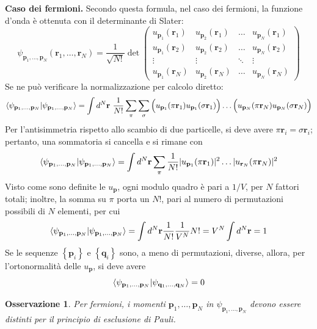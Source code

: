 \documentclass[11pt, a4paper]{scrartcl}
\theoremstyle{style}
\newtheorem{osservazione}{Osservazione}[section]
\theoremstyle{style1}
\numberwithin{equation}{subsection}
\begin{document}
\textbf{Caso dei fermioni.} Secondo questa formula, nel caso dei fermioni, la funzione d'onda \`e ottenuta con il determinante di Slater:
\[
	\psi _{\mathbf{p} _1,\ldots, \mathbf{p} _N} (\mathbf{r} _1,\ldots,\mathbf{r} _N) = \frac{1}{\sqrt{N!} } \det \begin{pmatrix} u_{\mathbf{p} _1} (\mathbf{r} _1) & u_{\mathbf{p} _2} (\mathbf{r} _1) &\ldots & u_{\mathbf{p} _N} (\mathbf{r} _1)\\u_{\mathbf{p} _1} (\mathbf{r} _2) & u_{\mathbf{p} _2} (\mathbf{r} _2) &\ldots & u_{\mathbf{p} _N} (\mathbf{r} _2)\\ \vdots & \vdots & \ddots & \vdots \\ u_{\mathbf{p} _1} (\mathbf{r} _N)&u_{\mathbf{p} _2} (\mathbf{r} _N)&\ldots& u_{\mathbf{p} _N} (\mathbf{r} _N)\end{pmatrix} 
\] 
Se ne pu\`o verificare la normalizzazione per calcolo diretto:
\[
\braket{\psi _{\mathbf{p} _1 ,\ldots, \mathbf{p} _N} |\psi _{\mathbf{p} _1,\ldots,\mathbf{p} _N} }  = \int d^N \mathbf{r}  \ \frac{1}{N!} \sum_{\pi}^{} \sum_{\sigma }^{} \Big(u_{\mathbf{p} _1} (\pi \mathbf{r} _1) u_{\mathbf{p} _1} (\sigma \mathbf{r} _1)\Big) \ldots \Big(u_{\mathbf{p} _N} (\pi\mathbf{r} _N) u_{\mathbf{p} _N} (\sigma \mathbf{r} _N )\Big)
\] 
Per l'antisimmetria rispetto allo scambio di due particelle, si deve avere $\pi \mathbf{r} _i = \sigma \mathbf{r} _i$; pertanto, una sommatoria si cancella e si rimane con
\[
\braket{\psi _{\mathbf{p} _1 ,\ldots, \mathbf{p} _N} |\psi _{\mathbf{p} _1,\ldots,\mathbf{p} _N} }  = \int d^N \mathbf{r} \sum_{\pi}^{} \frac{1}{N!} \lvert u_{\mathbf{p} _1} (\pi\mathbf{r} _1) \rvert ^2 \ldots \lvert u_{\mathbf{r} _N} (\pi\mathbf{r} _N) \rvert ^2
\] 
Visto come sono definite le $u_\mathbf{p} $, ogni modulo quadro \`e pari a $1 / V$, per $N$ fattori totali; inoltre, la somma su $\pi$ porta un $N!$, pari al numero di permutazioni possibili di $N$ elementi, per cui
\[
\braket{\psi _{\mathbf{p} _1 ,\ldots, \mathbf{p} _N} |\psi _{\mathbf{p} _1,\ldots,\mathbf{p} _N} }  = \int d^N \mathbf{r} \frac{1}{N!} \frac{1}{V^N} N! = V^N \int d^N\mathbf{r}  = 1
\] 
Se le sequenze $\left\{ \mathbf{p} _i \right\} $ e $\left\{ \mathbf{q} _i \right\} $ sono, a meno di permutazioni, diverse, allora, per l'ortonormalit\`a delle $u_\mathbf{p} $, si deve avere
\[
\braket{\psi _{\mathbf{p}_1,\ldots,\mathbf{p} _N }|\psi _{\mathbf{q}_1,\ldots,\mathbf{q} _N }}  = 0
\] 
\begin{osservazione}
Per fermioni, i momenti $\mathbf{p} _1,\ldots,\mathbf{p} _N$ in $\psi _{\mathbf{p} _1,\ldots,\mathbf{p} _N} $ devono essere distinti per il principio di esclusione di Pauli.
\end{osservazione}
\vspace{.5cm}
\end{document}
